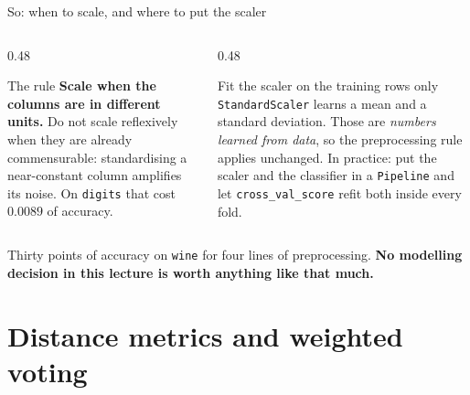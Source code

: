 \documentclass[aspectratio=169]{beamer}
\begin{document}
\begin{frame}[shrink=6]{So: when to scale, and where to put the scaler}
  \begin{columns}[T]
    \begin{column}{0.48\textwidth}
      \begin{exampleblock}{The rule}
        \small \textbf{Scale when the columns are in different units.} Do not
        scale reflexively when they are already commensurable: standardising a
        near-constant column amplifies its noise. On \texttt{digits} that cost
        $0.0089$ of accuracy.
      \end{exampleblock}
    \end{column}
    \begin{column}{0.48\textwidth}
      \begin{alertblock}{Fit the scaler on the training rows only}
        \small \texttt{StandardScaler} learns a mean and a standard deviation.
        Those are \emph{numbers learned from data}, so the preprocessing rule
        applies unchanged. In practice: put the scaler and the classifier in a
        \texttt{Pipeline} and let \texttt{cross\_val\_score} refit both inside
        every fold.
      \end{alertblock}
    \end{column}
  \end{columns}
  \vspace{0.3em}
  \begin{center}\small
    Thirty points of accuracy on \texttt{wine} for four lines of
    preprocessing. \textbf{No modelling decision in this lecture is worth
    anything like that much.}
  \end{center}
\end{frame}

\section[Metrics]{Distance metrics and weighted voting}
\label{sec:metric}
\end{document}
